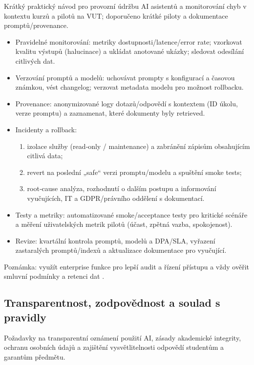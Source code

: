 \documentclass{report}%
\begin{document}
%
\begin{flushleft}Krátký praktický návod pro provozní údržbu AI asistentů a monitorování chyb v kontextu kurzů a pilotů na VUT; doporučeno krátké piloty a dokumentace promptů/provenance.\end{flushleft}
\begin{itemize}
  \item Pravidelné monitorování: metriky dostupnosti/latence/error rate; vzorkovat kvalitu výstupů (halucinace) a ukládat anotované ukázky; sledovat odesílání citlivých dat.
  \item Verzování promptů a modelů: uchovávat prompty s konfigurací a časovou známkou, vést changelog; verzovat metadata modelu pro možnost rollbacku.
  \item Provenance: anonymizované logy dotazů/odpovědí s kontextem (ID úkolu, verze promptu) a zaznamenat, které dokumenty byly retrieved.
  \item Incidenty a rollback:
    \begin{enumerate}
      \item izolace služby (read‑only / maintenance) a zabránění zápisům obsahujícím citlivá data;
      \item revert na poslední „safe“ verzi promptu/modelu a spuštění smoke tests;
      \item root‑cause analýza, rozhodnutí o dalším postupu a informování vyučujících, IT a GDPR/právního oddělení s dokumentací.
    \end{enumerate}
  \item Testy a metriky: automatizované smoke/acceptance testy pro kritické scénáře a měření uživatelských metrik pilotů (účast, zpětná vazba, spokojenost).
  \item Revize: kvartální kontrola promptů, modelů a DPA/SLA, vyřazení zastaralých promptů/indexů a aktualizace dokumentace pro vyučující.
\end{itemize}
\begin{flushleft}Poznámka: využít enterprise funkce pro lepší audit a řízení přístupu a vždy ověřit smluvní podmínky a retenci dat \cite{kb_ai_101_tipu_pdf_04e4a115_page_3_1}.\end{flushleft}%

%
\subsection{Transparentnost, zodpovědnost a soulad s pravidly}%
Požadavky na transparentní oznámení použití AI, zásady akademické integrity, ochranu osobních údajů a zajištění vysvětlitelnosti odpovědí studentům a garantům předmětu.%
\end{document}
